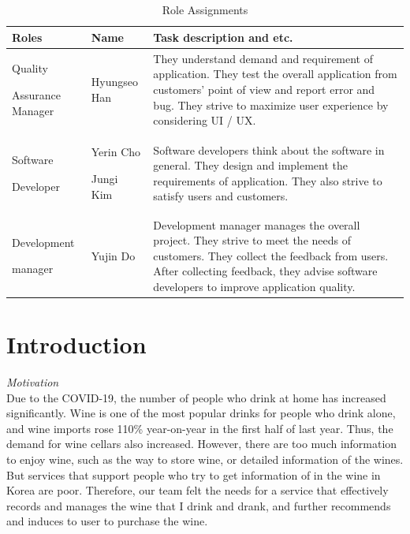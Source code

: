\documentclass[conference]{IEEEtran}
\numberwithin{figure}{subsection}
\begin{document}
\begin{table}[h]
\caption{Role Assignments}
\def\arraystretch{1.24} \small

\begin{tabular}{|p{1.8cm}|p{1.4cm}|p{4.4cm}|}

\hline
Roles & Name & Task description and etc. \\ \hline
Quality\par Assurance Manager&  Hyungseo Han & They understand demand and requirement of application. They test the overall application from customers’ point of view and report error and bug. They strive to maximize user experience by considering UI / UX. \\ \hline

Software \par Developer & Yerin Cho \par Jungi Kim  & Software developers think about the software in general. They design and implement the requirements of application. They also strive to satisfy users and customers. \\ \hline

Development \par manager & Yujin Do & Development manager manages the overall project. They strive to meet the needs of customers. They collect the feedback from users. After collecting feedback, they advise software developers to improve application quality. \\ \hline

\end{tabular}

\end{table}
\section{Introduction} \noindent\textit{Motivation}\\
\indent Due to the COVID-19, the number of people who drink at home has increased significantly. Wine is one of the most popular drinks for people who drink alone, and wine imports rose 110\% year-on-year in the first half of last year. Thus, the demand for wine cellars also increased. However, there are too much information to enjoy wine, such as the way to store wine, or detailed information of the wines. But services that support people who try to get information of in the wine in Korea are poor. Therefore, our team felt the needs for a service that effectively records and manages the wine that I drink and drank, and further recommends and induces to user to purchase the wine.\\
\end{document}

